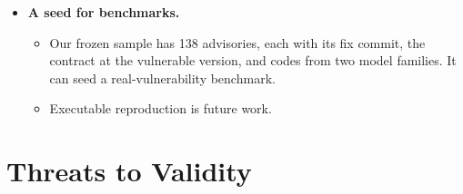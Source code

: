 \documentclass[conference]{IEEEtran}
\begin{document}
\begin{itemize}
\begin{itemize}
\item Clients and gateways that rely on the contract cannot tell that an operation's access rules changed.
\end{itemize}
\item \textbf{A seed for benchmarks.}
\begin{itemize}
\item Our frozen sample has 138 advisories, each with its fix commit, the contract at the vulnerable version, and codes from two model families. It can seed a real-vulnerability benchmark.
\item Executable reproduction is future work.
\end{itemize}
\end{itemize}

\section{Threats to Validity}
\end{document}
